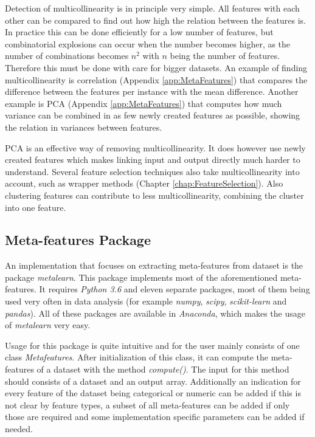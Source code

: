 \documentclass[10pt,a4paper]{report}
\begin{document}
	Detection of multicollinearity is in principle very simple. All features with each other can be compared to find out how high the relation between the features is. In practice this can be done efficiently for a low number of features, but combinatorial explosions can occur when the number becomes higher, as the number of combinations becomes $n^2$ with $n$ being the number of features. Therefore this must be done with care for bigger datasets. An example of finding multicollinearity is correlation (Appendix \ref{app:MetaFeatures}) that compares the difference between the features per instance with the mean difference. Another example is PCA (Appendix \ref{app:MetaFeatures}) that computes how much variance can be combined in as few newly created features as possible, showing the relation in variances between features.
	
	PCA is an effective way of removing multicollinearity. It does however use newly created features which makes linking input and output directly much harder to understand. Several feature selection techniques also take multicollinearity into account, such as wrapper methods (Chapter \ref{chap:FeatureSelection}). Also clustering features can contribute to less multicollinearity, combining the cluster into one feature\cite{rokach2005clustering}.
	
	\subsection{Meta-features Package}
	\label{DEsubsec:MetaFeatures}
	
	An implementation that focuses on extracting meta-features from dataset is the package \textit{metalearn}. This package implements most of the aforementioned meta-features. It requires \textit{Python 3.6} and eleven separate packages, most of them being used very often in data analysis (for example \textit{numpy}, \textit{scipy}, \textit{scikit-learn} and \textit{pandas}). All of these packages are available in \textit{Anaconda}, which makes the usage of \textit{metalearn} very easy.
	
	Usage for this package is quite intuitive and for the user mainly consists of one class \textit{Metafeatures}. After initialization of this class, it can compute the meta-features of a dataset with the method \textit{compute()}. The input for this method should consists of a dataset and an output array. Additionally an indication for every feature of the dataset being categorical or numeric can be added if this is not clear by feature types, a subset of all meta-features can be added if only those are required and some implementation specific parameters can be added if needed.
	
\end{document}
